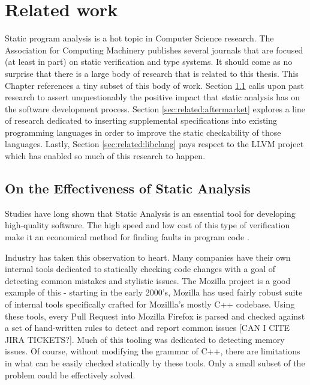 \chapter{Related work}\label{sec:related}

Static program analysis is a hot topic in Computer Science research.  The Association for Computing Machinery publishes several journals that are focused (at least in part) on static verification and type systems.  It should come as no surprise that there is a large body of research that is related to this thesis.  This Chapter references a tiny subset of this body of work.  Section \ref{sec:related:effectiveness} calls upon past research to assert unquestionably the positive impact that static analysis has on the software development process.  Section \ref{sec:related:aftermarket} explores a line of research dedicated to inserting supplemental specifications into existing programming languages in order to improve the static checkability of those languages.  Lastly, Section \ref{sec:related:libclang} pays respect to the LLVM project which has enabled so much of this research to happen.

\section{On the Effectiveness of Static Analysis}\label{sec:related:effectiveness}

Studies have long shown that Static Analysis is an essential tool for developing high-quality software.  The high speed and low cost of this type of verification make it an economical method for finding faults in program code \cite{staticanal, static-anal-experience}.  

Industry has taken this observation to heart.  Many companies have their own internal tools dedicated to statically checking code changes with a goal of detecting common mistakes and stylistic issues.  The Mozilla project is a good example of this - starting in the early 2000's, Mozilla has used fairly robust suite of internal tools specifically crafted for Mozillla's mostly C++ codebase.  Using these tools, every Pull Request into Mozilla Firefox is parsed and checked against a set of hand-written rules to detect and report common issues \cite{mozilla-pork, mozilla-pork-blog} [CAN I CITE JIRA TICKETS?].  Much of this tooling was dedicated to detecting memory issues.  Of course, without modifying the grammar of C++, there are limitations in what can be easily checked statically by these tools.  Only a small subset of the problem could be effectively solved.  

